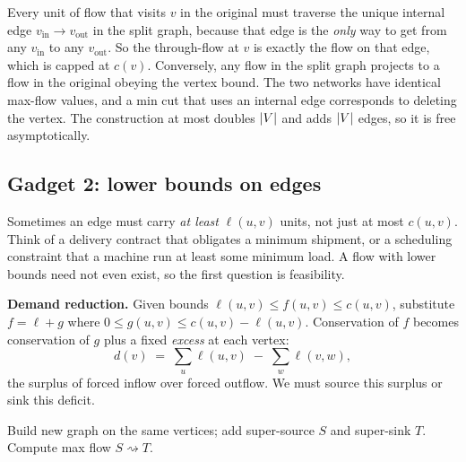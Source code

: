 \begin{whybox}
Every unit of flow that visits $v$ in the original must traverse the unique internal edge $v_{\text{in}}\to v_{\text{out}}$ in the split graph, because that edge is the \emph{only} way to get from any $v_{\text{in}}$ to any $v_{\text{out}}$. So the through-flow at $v$ is exactly the flow on that edge, which is capped at $c(v)$. Conversely, any flow in the split graph projects to a flow in the original obeying the vertex bound. The two networks have identical max-flow values, and a min cut that uses an internal edge corresponds to deleting the vertex. The construction at most doubles $\lvert V\rvert$ and adds $\lvert V\rvert$ edges, so it is free asymptotically.
\end{whybox}

\subsection{Gadget 2: lower bounds on edges}
\label{ch18:lower-bounds}

Sometimes an edge must carry \emph{at least} $\ell(u,v)$ units, not just at most $c(u,v)$. Think of a delivery contract that obligates a minimum shipment, or a scheduling constraint that a machine run at least some minimum load. A flow with lower bounds need not even exist, so the first question is feasibility.

\begin{focusbox}
\textbf{Demand reduction.} Given bounds $\ell(u,v) \le f(u,v) \le c(u,v)$, substitute $f = \ell + g$ where $0 \le g(u,v) \le c(u,v)-\ell(u,v)$. Conservation of $f$ becomes conservation of $g$ plus a fixed \emph{excess} at each vertex:
\[
  d(v) \;=\; \sum_{u} \ell(u,v) \;-\; \sum_{w} \ell(v,w),
\]
the surplus of forced inflow over forced outflow. We must source this surplus or sink this deficit.
\end{focusbox}

\begin{algorithm}[H]
\caption{Feasible circulation with lower bounds}
\label{ch18:alg-lowerbound}
\DontPrintSemicolon
{}
Build new graph on the same vertices; add super-source $S$ and super-sink $T$.\;
Compute max flow $S\rightsquigarrow T$.\;
\end{algorithm}

